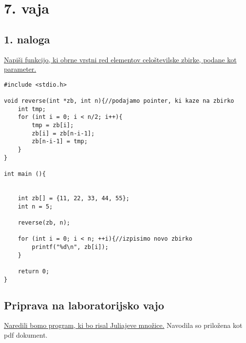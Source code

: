 \documentclass[a4paper, 12pt]{article}
\begin{document}
\section*{7. vaja}

\subsection*{1. naloga}

\underline{Napiši funkcijo, ki obrne vrstni red elementov celoštevilske zbirke, podane kot parameter.}

\begin{lstlisting}
#include <stdio.h>

void reverse(int *zb, int n){//podajamo pointer, ki kaze na zbirko
	int tmp;
	for (int i = 0; i < n/2; i++){
		tmp = zb[i];
		zb[i] = zb[n-i-1];
		zb[n-i-1] = tmp;
	}
}

int main (){
	
	
	int zb[] = {11, 22, 33, 44, 55};
	int n = 5;
	
	reverse(zb, n);
	
	for (int i = 0; i < n; ++i){//izpisimo novo zbirko
		printf("%d\n", zb[i]);
	}
	
	return 0;
}
\end{lstlisting}


\subsection*{Priprava na laboratorijsko vajo}
\underline{Naredili bomo program, ki bo risal Juliajeve množice.}
Navodila so priložena kot pdf dokument.
\end{document}
